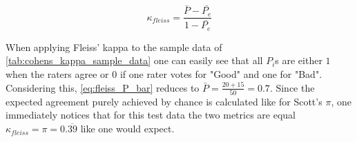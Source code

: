 \begin{equation}\label{eq:fleiss_kappa}
    \kappa_{fleiss} = \frac{\bar{P}-\bar{P_e}}{1-\bar{P_e}}
\end{equation}

When applying Fleiss' kappa to the sample data of \cref{tab:cohens_kappa_sample_data} one can easily see that all $P_i$s are either $1$ when the raters agree or $0$ if one rater votes for "Good" and one for "Bad".
Considering this, \cref{eq:fleiss_P_bar} reduces to $\bar{P} = \frac{20+15}{50} = 0.7$.
Since the expected agreement purely achieved by chance is calculated like for Scott's $\pi$, one immediately notices that for this test data the two metrics are equal $\kappa_{fleiss} = \pi = 0.\overline{39}$ like one would expect.
